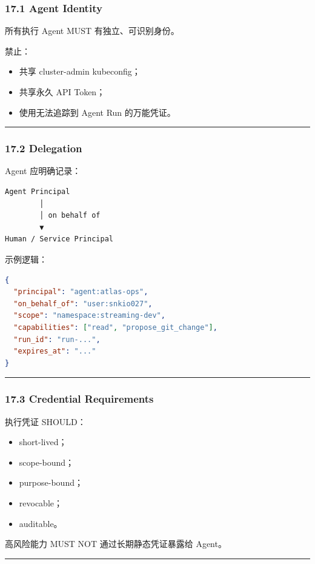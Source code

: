 \documentclass[11pt,a4paper]{article}
\begin{document}
\subsubsection{17.1 Agent Identity}
所有执行 Agent MUST 有独立、可识别身份。

禁止：

\begin{itemize}
  \item 共享 cluster-admin kubeconfig；
  \item 共享永久 API Token；
  \item 使用无法追踪到 Agent Run 的万能凭证。
\end{itemize}
\vspace{0.5em}\hrule\vspace{0.5em}
\subsubsection{17.2 Delegation}
Agent 应明确记录：

\begin{lstlisting}[language=text]
Agent Principal
        │
        │ on behalf of
        ▼
Human / Service Principal
\end{lstlisting}
示例逻辑：

\begin{lstlisting}[language=json]
{
  "principal": "agent:atlas-ops",
  "on_behalf_of": "user:snkio027",
  "scope": "namespace:streaming-dev",
  "capabilities": ["read", "propose_git_change"],
  "run_id": "run-...",
  "expires_at": "..."
}
\end{lstlisting}
\vspace{0.5em}\hrule\vspace{0.5em}
\subsubsection{17.3 Credential Requirements}
执行凭证 SHOULD：

\begin{itemize}
  \item short-lived；
  \item scope-bound；
  \item purpose-bound；
  \item revocable；
  \item auditable。
\end{itemize}
高风险能力 MUST NOT 通过长期静态凭证暴露给 Agent。

\vspace{0.5em}\hrule\vspace{0.5em}
\end{document}
